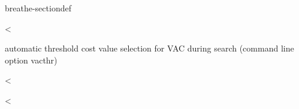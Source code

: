 \documentclass[letterpaper,10pt,openany,oneside,english]{sphinxmanual}
\begin{document}
\begin{fulllineitems}
\begin{sphinxuseclass}{breathe-sectiondef}

\begin{fulllineitems}
\label{\detokenize{ref/ref_cpp:_CPPv4N8ToulBar212nbTimesIsVACE}}\label{\detokenize{ref/ref_cpp:_CPPv3N8ToulBar212nbTimesIsVACE}}\label{\detokenize{ref/ref_cpp:_CPPv2N8ToulBar212nbTimesIsVACE}}\label{\detokenize{ref/ref_cpp:ToulBar2::nbTimesIsVAC__i}}
\pysigstartsignatures
\pysigstartmultiline
{}
\pysigstopmultiline
\pysigstopsignatures
\sphinxAtStartPar
\textless{} 

\sphinxAtStartPar
automatic threshold cost value selection for VAC during search (command line option \sphinxhyphen{}vacthr) 

\end{fulllineitems}


\begin{fulllineitems}
\label{\detokenize{ref/ref_cpp:_CPPv4N8ToulBar234nbTimesIsVACitThresholdMoreThanOneE}}\label{\detokenize{ref/ref_cpp:_CPPv3N8ToulBar234nbTimesIsVACitThresholdMoreThanOneE}}\label{\detokenize{ref/ref_cpp:_CPPv2N8ToulBar234nbTimesIsVACitThresholdMoreThanOneE}}\label{\detokenize{ref/ref_cpp:ToulBar2::nbTimesIsVACitThresholdMoreThanOne__i}}
\pysigstartsignatures
\pysigstartmultiline
{}
\pysigstopmultiline
\pysigstopsignatures
\sphinxAtStartPar
\textless{} 

\end{fulllineitems}


\begin{fulllineitems}
\label{\detokenize{ref/ref_cpp:_CPPv4N8ToulBar25RASPSE}}\label{\detokenize{ref/ref_cpp:_CPPv3N8ToulBar25RASPSE}}\label{\detokenize{ref/ref_cpp:_CPPv2N8ToulBar25RASPSE}}\label{\detokenize{ref/ref_cpp:ToulBar2::RASPS__b}}
\pysigstartsignatures
\pysigstartmultiline
{}
\pysigstopmultiline
\pysigstopsignatures
\sphinxAtStartPar
\textless{} 


\end{fulllineitems}
\end{sphinxuseclass}
\end{fulllineitems}
\end{document}
